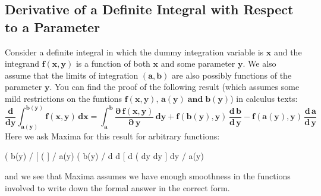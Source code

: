 \documentclass[12pt]{article}
\begin{document}
\subsection{Derivative of a Definite Integral with Respect to a Parameter}
\noindent Consider a definite integral in which the dummy integration variable
  is $\mathbf{x}$ and the integrand $\mathbf{f\boldsymbol{(x,y)}}$ is a function of both $\mathbf{x}$
  and some parameter $\mathbf{y}$.
We also assume that the limits of integration $\mathbf{(a,b)}$ are also possibly
  functions of the parameter $\mathbf{y}$.
You can find the proof of the following result (which assumes some mild
 restrictions on the funtions $\mathbf{f(x,y),\, a(y) \; \text{and} \; b(y)}$) in calculus texts:
\begin{equation}
\mathbf{\frac{d}{dy} \int_{a(y)}^{b(y)} f(x,y) \, dx =
   \int_{a}^{b} \frac{\boldsymbol{\partial} \, f(x,y)}{\boldsymbol{\partial} \,y} \,dy  +
   f(b(y),y) \,\frac{d\,b}{d\,y} - f(a(y),y) \, \frac{d\,a}{d\,y} }
\end{equation}
Here we ask Maxima for this result for arbitrary functions:
\begin{myVerbatim}
(%
                                b(y)
                               /
                               [
(%
                               ]
                               /
                                a(y)
(%
                                                         b(y)
                                                        /
                  d                        d            [      d
(%
                  dy                       dy           ]      dy
                                                        /
                                                         a(y)
\end{myVerbatim} 
and we see that Maxima assumes we have enough smoothness in the functions
  involved to write down the formal answer in the correct form.\\
\end{document}
